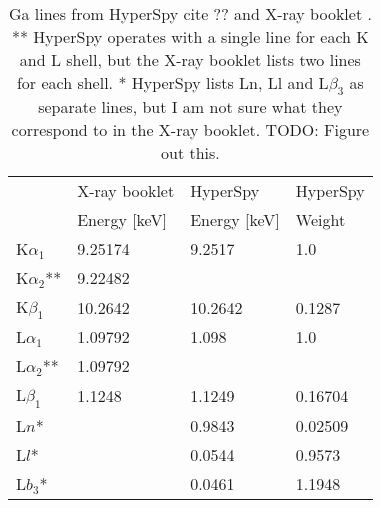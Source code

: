 
\begin{table}[tbp]
    \centering
    \caption{
        Ga lines from HyperSpy cite ?? and X-ray booklet \cite{thompson_x-ray_2004}.
        ** HyperSpy operates with a single line for each K and L shell, but the X-ray booklet lists two lines for each shell.
        * HyperSpy lists Ln, Ll and L$\beta_3$ as separate lines, but I am not sure what they correspond to in the X-ray booklet.
        TODO: Figure out this.
    }
    \label{tab:theory:Ga-lines}
    \begin{tabular}{llll}
                       & X-ray booklet & HyperSpy     & HyperSpy \\
                       & Energy [keV]  & Energy [keV] & Weight   \\
        \hline
        K$ \alpha_1$   & 9.25174       & 9.2517       & 1.0      \\
        K$ \alpha_2$** & 9.22482       &              &          \\
        K$ \beta_1$    & 10.2642       & 10.2642      & 0.1287   \\
        L$ \alpha_1$   & 1.09792       & 1.098        & 1.0      \\
        L$ \alpha_2$** & 1.09792       &              &          \\
        L$ \beta_1$    & 1.1248        & 1.1249       & 0.16704  \\
        L$n$*          &               & 0.9843       & 0.02509  \\
        L$l$*          &               & 0.0544       & 0.9573   \\
        L$b_3$*        &               & 0.0461       & 1.1948
    \end{tabular}

\end{table}